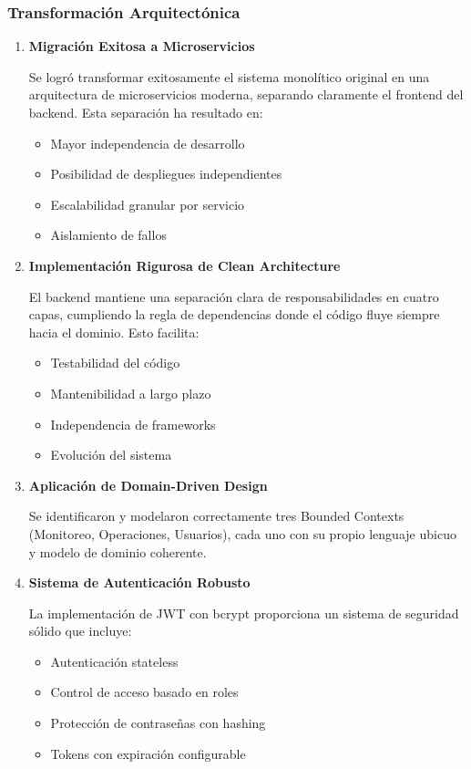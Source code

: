 \documentclass[12pt,a4paper]{article}
\begin{document}
\subsubsection{Transformación Arquitectónica}

\begin{enumerate}[leftmargin=*]
    \item \textbf{Migración Exitosa a Microservicios}

    Se logró transformar exitosamente el sistema monolítico original en una arquitectura de microservicios moderna, separando claramente el frontend del backend. Esta separación ha resultado en:
    \begin{itemize}
        \item Mayor independencia de desarrollo
        \item Posibilidad de despliegues independientes
        \item Escalabilidad granular por servicio
        \item Aislamiento de fallos
    \end{itemize}

    \item \textbf{Implementación Rigurosa de Clean Architecture}

    El backend mantiene una separación clara de responsabilidades en cuatro capas, cumpliendo la regla de dependencias donde el código fluye siempre hacia el dominio. Esto facilita:
    \begin{itemize}
        \item Testabilidad del código
        \item Mantenibilidad a largo plazo
        \item Independencia de frameworks
        \item Evolución del sistema
    \end{itemize}

    \item \textbf{Aplicación de Domain-Driven Design}

    Se identificaron y modelaron correctamente tres Bounded Contexts (Monitoreo, Operaciones, Usuarios), cada uno con su propio lenguaje ubicuo y modelo de dominio coherente.

    \item \textbf{Sistema de Autenticación Robusto}

    La implementación de JWT con bcrypt proporciona un sistema de seguridad sólido que incluye:
    \begin{itemize}
        \item Autenticación stateless
        \item Control de acceso basado en roles
        \item Protección de contraseñas con hashing
        \item Tokens con expiración configurable
    \end{itemize}
\end{enumerate}
\end{document}
